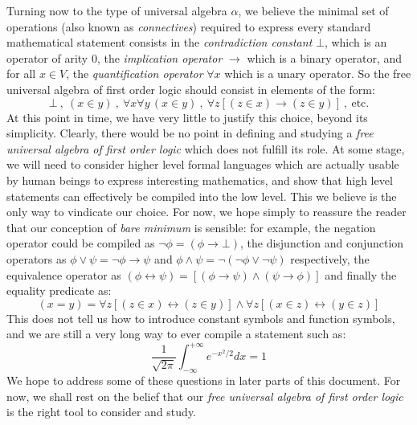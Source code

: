 Turning now to the type of universal algebra $\alpha$, we believe
the minimal set of operations (also known as {\em connectives})
required to express every standard mathematical statement consists
in the {\em contradiction constant} $\bot$, which is an operator of
arity $0$, the {\em implication operator} $\to$ which is a binary
operator, and for all $x\in V$, the {\em quantification operator}
$\forall x$ which is a unary operator. So the free universal algebra
of first order logic should consist in elements of the form:
    \[
    \bot\ ,\  (x\in y)\ ,\ \forall x\forall y\,(x\in y)\ ,\
    \forall z[(z\in x)\to(z\in y)]\ ,\ \mbox{etc.}
    \]
At this point in time, we have very little to justify this choice,
beyond its simplicity. Clearly, there would be no point in defining
and studying a {\em free universal algebra of first order logic}
which does not fulfill its role. At some stage, we will need to
consider higher level formal languages which are actually usable by
human beings to express interesting mathematics, and show that high
level statements can effectively be compiled into the low level.
This we believe is the only way to vindicate our choice. For now, we
hope simply to reassure the reader that our conception of {\em bare
minimum} is sensible: for example, the negation operator could be
compiled as $\lnot\phi=(\phi\to\bot)$, the disjunction and
conjunction operators as $\phi\lor\psi=\lnot\phi\to\psi$ and
$\phi\land\psi=\lnot(\lnot\phi\lor\lnot\psi)$ respectively, the
equivalence operator as
$(\phi\leftrightarrow\psi)=[(\phi\to\psi)\land(\psi\to\phi)]$ and
finally the equality predicate as:
    \[
    (x=y) = \forall z[(z\in x)\leftrightarrow(z\in y)]\land\forall z[(x\in z)\leftrightarrow(y\in z)]
    \]
This does not tell us how to introduce constant symbols and function
symbols, and we are still a very long way to ever compile a
statement such as:
    \[
    \frac{1}{\sqrt{2\pi}}\int_{-\infty}^{+\infty}e^{-x^{2}/2}dx=1
    \]
We hope to address some of these questions in later parts of this
document. For now, we shall rest on the belief that our {\em free
universal algebra of first order logic} is the right tool to
consider and study.

